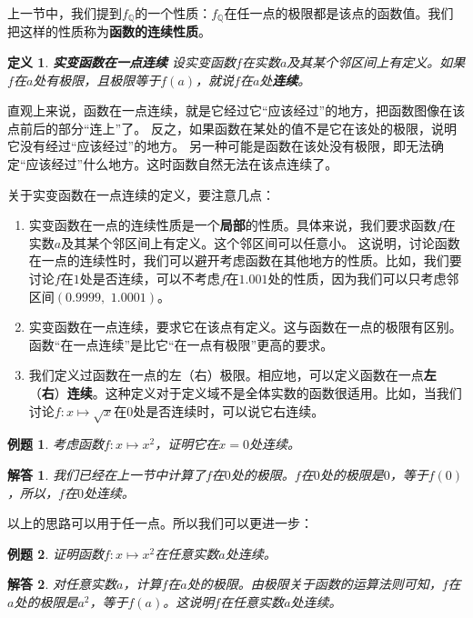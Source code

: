 \documentclass[12pt,UTF8]{ctexbook}
\newtheorem{df}{定义}[section]
\newtheorem{et}{例题}[section]
\newtheorem*{so}{解答}
\begin{document}
上一节中，我们提到$f_{\mathbb{Q}}$的一个性质：$f_{\mathbb{Q}}$在任一点的极限都是该点的函数值。我们把这样的性质称为\textbf{函数的连续性质}。

\begin{df}{\textbf{实变函数在一点连续}}
    设实变函数$f$在实数$a$及其某个邻区间上有定义。如果$f$在$a$处有极限，且极限等于$f(a)$，就说$f$在$a$处\textbf{连续}。
\end{df}

直观上来说，函数在一点连续，就是它经过它“应该经过”的地方，把函数图像在该点前后的部分“连上”了。
反之，如果函数在某处的值不是它在该处的极限，说明它没有经过“应该经过”的地方。
另一种可能是函数在该处没有极限，即无法确定“应该经过”什么地方。这时函数自然无法在该点连续了。

关于实变函数在一点连续的定义，要注意几点：
\begin{enumerate}
    \item 实变函数在一点的连续性质是一个\textbf{局部}的性质。具体来说，我们要求函数$f$在实数$a$及其某个邻区间上有定义。这个邻区间可以任意小。
    这说明，讨论函数在一点的连续性时，我们可以避开考虑函数在其他地方的性质。比如，我们要讨论$f$在$1$处是否连续，可以不考虑$f$在$1.001$处的性质，因为我们可以只考虑邻区间$(0.9999,\,\,1.0001)$。
    \item 实变函数在一点连续，要求它在该点有定义。这与函数在一点的极限有区别。函数“在一点连续”是比它“在一点有极限”更高的要求。
    \item 我们定义过函数在一点的左（右）极限。相应地，可以定义函数在一点\textbf{左}（\textbf{右}）\textbf{连续}。这种定义对于定义域不是全体实数的函数很适用。比如，当我们讨论$f:x\mapsto \sqrt{x}$在$0$处是否连续时，可以说它右连续。
\end{enumerate}

\begin{et}
    考虑函数$f:x\mapsto x^2$，证明它在$x=0$处连续。
\end{et}
\begin{so}
    我们已经在上一节中计算了$f$在$0$处的极限。$f$在$0$处的极限是$0$，等于$f(0)$，所以，$f$在$0$处连续。
\end{so}

以上的思路可以用于任一点。所以我们可以更进一步：
\begin{et}
    证明函数$f:x\mapsto x^2$在任意实数$a$处连续。
\end{et}
\begin{so}
    对任意实数$a$，计算$f$在$a$处的极限。由极限关于函数的运算法则可知，$f$在$a$处的极限是$a^2$，等于$f(a)$。这说明$f$在任意实数$a$处连续。
\end{so}
\end{document}

